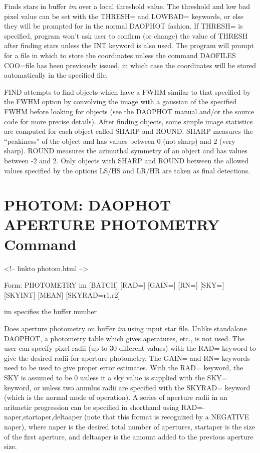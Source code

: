 Finds stars in buffer \textit{im} over a local threshold value. 
The threshold and low bad pixel value can be set
with the THRESH= and LOWBAD= keywords, or else they will be prompted for in
the normal DAOPHOT fashion. If THRESH= is specified, program won't ask user
to confirm (or change) the value of THRESH after finding stars unless the INT keyword is
also used. The program will prompt for a file in which to store the
coordinates unless the command DAOFILES COO=file has been previously
issued, in which case the coordinates will be stored automatically in the
specified file.

FIND attempts to find objects which have a FWHM similar to that specified by
the FWHM option by convolving the image with a gaussian of the specified
FWHM before looking for objects (see the DAOPHOT manual and/or the source
code for more precise details). After finding objects, some simple image
statistics are computed for each object called SHARP and ROUND. SHARP measures
the ``peakiness'' of the object and has values between 0 (not sharp) and
2 (very sharp). ROUND measures the azimuthal symmetry of an object and has
values between -2 and 2. Only objects with SHARP and ROUND between the
allowed values specified by the options LS/HS and LR/HR are taken as final
detections.

\section{PHOTOM: DAOPHOT APERTURE PHOTOMETRY Command}
\begin{rawhtml}
<!-- linkto photom.html -->
\end{rawhtml}
\begin{command}
  \item[Form: PHOTOMETRY im {[BATCH]} {[RAD=]} {[GAIN=]} {[RN=]} {[SKY=]} {[SKYINT]} {[MEAN]} {[SKYRAD=r1,r2]}\hfill]{}
  \item[im]{specifies the buffer number}
\end{command}

Does aperture photometry on buffer \textit{im} using input star file.  Unlike
standalone DAOPHOT, a photometry table which gives aperatures, etc., is not
used.  The user can specify pixel radii (up to 30 different
values) with the RAD= keyword to give the desired radii for aperture
photometry. The GAIN= and RN= keywords need to be
used to give proper error estimates. With the RAD= keyword, the SKY is
assumed to be 0 unless it a sky value is supplied with the SKY= keyword, or 
unless two annulus radii are specified with the SKYRAD= keyword 
(which is the normal mode of operation).  A series of
aperture radii in an aritmetic progression can be specified in shorthand using
RAD=-naper,startaper,deltaaper (note that this format is recognized by a
NEGATIVE naper), where naper is the desired total number of apertures,
startaper is the size of the first aperture, and deltaaper is the amount
added to the previous aperture size.

